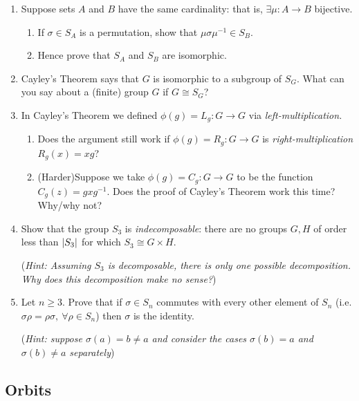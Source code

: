 \begin{exercises}
\begin{enumerate}
		
	  \item\label{exs:symmwd} Suppose sets $A$ and $B$ have the same cardinality: that is, $\exists \mu:A\to B$ bijective.
	  \begin{enumerate}
	    \item If $\sigma\in S_A$ is a permutation, show that $\mu\sigma\mu^{-1}\in S_B$.
	    \item Hence prove that $S_A$ and $S_B$ are isomorphic.
	  \end{enumerate}
	  
	  
	  \item Cayley's Theorem says that $G$ is isomorphic to a subgroup of $S_G$.  What can you say about a (finite) group $G$ if $G\cong S_G$?
	
	  
	  \item In Cayley's Theorem we defined $\phi(g)=L_g:G\to G$ via \emph{left-multiplication.}
	  \begin{enumerate}
	    \item Does the argument still work if $\phi(g)=R_g:G\to G$ is \emph{right-multiplication} $R_g(x)=xg$?
	    
	    \item (Harder)\lstsp Suppose we take $\phi(g)=C_g:G\to G$ to be the function $C_g(z)=gx g^{-1}$. Does the proof of Cayley's Theorem work this time? Why/why not?
	  \end{enumerate}
		
		
		\item Show that the group $S_3$ is \emph{indecomposable}: there are no groups $G,H$ of order less than $\left| S_3\right|$ for which $S_3\cong G\times H$.\par
		(\emph{Hint: Assuming $S_3$ is decomposable, there is only one possible decomposition. Why does this decomposition make no sense?})
	  
	  
	  \item\label{exs:centerSn} Let $n\ge 3$. Prove that if $\sigma\in S_n$ commutes with every other element of $S_n$ (i.e. $\sigma\rho=\rho\sigma,\ \forall \rho\in S_n$) then $\sigma$ is the identity.\par
	  (\emph{Hint: suppose $\sigma(a)=b\neq a$ and consider the cases $\sigma(b)=a$ and $\sigma(b)\neq a$ separately})
	
	\end{enumerate}
\end{exercises}


\clearpage


\subsection{Orbits}\label{sec:orbits}

